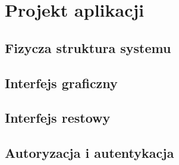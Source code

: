 \chapter{Projekt aplikacji}
\label{cha:projektAplikacji}

\section{Fizycza struktura systemu}
\label{sec:przypadkiUzycia}

\section{Interfejs graficzny}
\label{sec:interfejsGraficzny}

\section{Interfejs restowy}
\label{sec:interfejsRestowy}

\section{Autoryzacja i autentykacja}
\label{sec:autoryzacjaAutentykacja}

